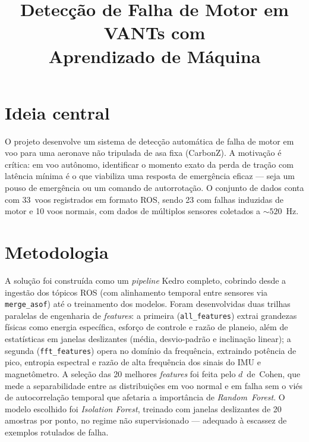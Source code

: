 \documentclass[12pt, a4paper]{article}
\begin{document}
\title{\textbf{Detecção de Falha de Motor em VANTs com\\Aprendizado de Máquina}}
\author{}
\date{}
\maketitle
\thispagestyle{empty}

\section{Ideia central}

O projeto desenvolve um sistema de detecção automática de falha de motor em voo
para uma aeronave não tripulada de asa fixa (CarbonZ). A motivação é crítica: em
voo autônomo, identificar o momento exato da perda de tração com latência mínima
é o que viabiliza uma resposta de emergência eficaz --- seja um pouso de
emergência ou um comando de autorrotação. O conjunto de dados conta com 33~voos
registrados em formato ROS, sendo 23 com falhas induzidas de motor e 10 voos
normais, com dados de múltiplos sensores coletados a ${\sim}520$~Hz.

\section{Metodologia}

A solução foi construída como um \textit{pipeline} Kedro completo, cobrindo desde
a ingestão dos tópicos ROS (com alinhamento temporal entre sensores via
\texttt{merge\_asof}) até o treinamento dos modelos. Foram desenvolvidas duas
trilhas paralelas de engenharia de \textit{features}: a primeira
(\texttt{all\_features}) extrai grandezas físicas como energia específica,
esforço de controle e razão de planeio, além de estatísticas em janelas
deslizantes (média, desvio-padrão e inclinação linear); a segunda
(\texttt{fft\_features}) opera no domínio da frequência, extraindo potência de
pico, entropia espectral e razão de alta frequência dos sinais do IMU e
magnetômetro. A seleção das 20 melhores \textit{features} foi feita pelo
$d$~de~Cohen, que mede a separabilidade entre as distribuições em voo normal e
em falha sem o viés de autocorrelação temporal que afetaria a importância de
\textit{Random~Forest}. O modelo escolhido foi \textit{Isolation Forest},
treinado com janelas deslizantes de 20 amostras por ponto, no regime não
supervisionado --- adequado à escassez de exemplos rotulados de falha.
\end{document}
